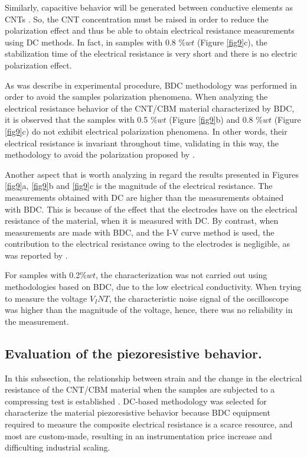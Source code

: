 \documentclass[twocolumn]{bmcart}%
\begin{document}
Similarly, capacitive behavior will be generated between conductive elements as CNTs \cite{Garcia-Macias2017a, Downey2017, Dong2016, Balberg1984}. So, the CNT concentration must be raised in order to reduce the polarization effect and thus be able to obtain electrical resistance measurements using DC methods. In fact, in samples with 0.8 $\%wt$ (Figure \ref{fig9}c),
the stabilization time of the electrical resistance is very short and there is no electric polarization effect.

As was describe in experimental procedure, BDC methodology was performed in order to avoid the samples polarization phenomena. When analyzing the electrical resistance behavior of the CNT/CBM material characterized by BDC, it is observed that the samples with 0.5 $\%wt$ (Figure \ref{fig9}b) and 0.8 $\%wt$ (Figure \ref{fig9}c) do not exhibit electrical polarization phenomena. In other words, their electrical resistance is invariant throughout time, validating in this way, the methodology  to avoid the polarization proposed by  \cite{Downey2017a, DAlessandro2017}.

Another aspect that is worth analyzing in regard the results presented in Figures \ref{fig9}a, \ref{fig9}b and \ref{fig9}c is the magnitude of the electrical resistance. The measurements obtained with DC are higher than the measurements obtained with BDC. This is because of the effect that the electrodes have on the electrical resistance of the material, when it is measured with DC. By contrast, when measurements are made with BDC, and the I-V curve method is used, the contribution to the electrical resistance owing to the electrodes is negligible, as was reported by  \cite{Konsta-Gdoutos2014}.

For samples with 0.2$\%wt$, the characterization was not carried out using methodologies based on BDC, due to the low electrical conductivity. When trying to measure the voltage $V_INT$, the characteristic noise signal of the oscilloscope was higher than the magnitude of the voltage, hence, there was no reliability in the measurement. 

\subsection{Evaluation of the piezoresistive behavior.}

In this subsection, the relationship between strain and the change in the electrical resistance of the CNT/CBM material when the samples are subjected to a compressing test is established . DC-based methodology  was selected for characterize the material piezoresistive behavior because BDC equipment required to measure the composite electrical resistance is a scarce resource, and most are custom-made, resulting in an instrumentation price increase and difficulting industrial scaling.
\end{document}
